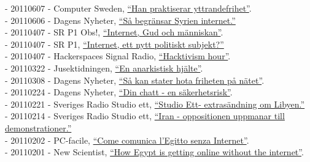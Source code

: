 \documentclass[a4paper,11pt,oneside]{article}
\begin{document}
    - 20110607 - Computer Sweden, \href{http://computersweden.idg.se/2.2683/1.388901/han-praktiserar-yttrandefrihet}{``Han praktiserar yttrandefrihet''}. \\
    - 20110606 - Dagens Nyheter, \href{http://www.dn.se/nyheter/varlden/sa-begransar-syrien-friheten-pa-internet}{``Så begränsar Syrien internet.''} \\
    - 20110407 - SR P1 Obs!, \href{http://t.sr.se/1zjt3PQ}{``Internet, Gud och människan''}. \\
    - 20110407 - SR P1, \href{http://t.sr.se/PbptWr}{``Internet, ett nytt politiskt subjekt?''} \\
    - 20110407 - Hackerspaces Signal Radio, \href{http://signal.hackerspaces.org/archive/2011-04-07-2200-hacktivism-hour.mp3}{``Hacktivism hour''}. \\
    - 20110322 - Jusektidningen, \href{http://www.tidningenkarriar.se/Arkivet/2011/3/Anarkistisk-hjalte/}{``En anarkistisk hjälte''}. \\
    - 20110308 - Dagens Nyheter, \href{http://www.dn.se/vart-internet/vart-internet-hem/sa-kan-stater-hota-friheten-pa-natet/}{``Så kan stater hota friheten på nätet''}. \\
    - 20110224 - Dagens Nyheter, \href{http://www.dn.se/vart-internet/vart-internet-hem/din-chatt-en-sakerhetsrisk/}{``Din chatt - en säkerhetsrisk''}. \\
    - 20110221 - Sveriges Radio Studio ett, \href{http://t.sr.se/1cUlHfI}{``Studio Ett- extrasändning om Libyen.''} \\
    - 20110214 - Sveriges Radio Studio ett, \href{http://t.sr.se/1D1zCXq}{``Iran - oppositionen uppmanar till demonstrationer.''} \\
    - 20110202 - PC-facile, \href{http://www.pc-facile.com/news/come_comunica_egitto_senza_internet/68959.htm}{``Come comunica l'Egitto senza Internet''}. \\
    - 20110201 - New Scientist, \href{http://www.newscientist.com/blogs/onepercent/2011/02/egypt-remains-officially-offli.html}{``How Egypt is getting online without the internet''}. \\
\end{document}
